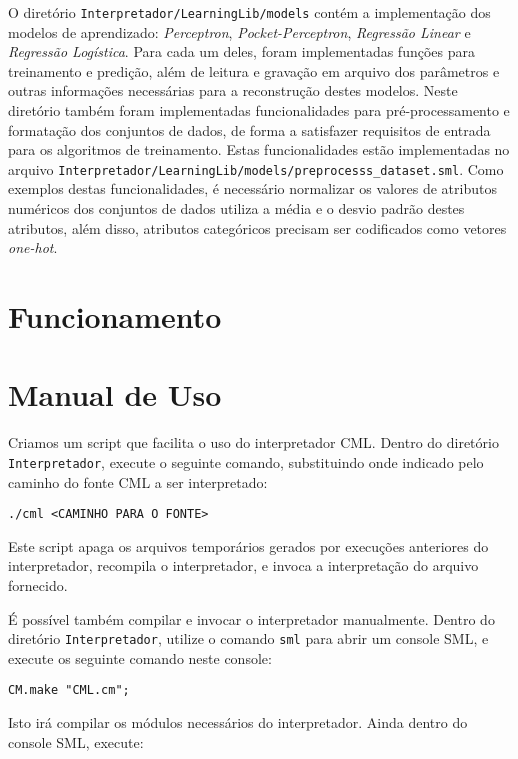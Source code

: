 \documentclass[12pt]{article}
\begin{document}
O diretório \texttt{Interpretador/LearningLib/models} contém a implementação dos modelos de aprendizado: \textit{Perceptron}, \textit{Pocket-Perceptron}, \textit{Regressão Linear} e \textit{Regressão Logística}. Para cada um deles, foram implementadas funções para treinamento e predição, além de leitura e gravação em arquivo dos parâmetros e outras informações necessárias para a reconstrução destes modelos. Neste diretório também foram implementadas funcionalidades para pré-processamento e formatação dos conjuntos de dados, de forma a satisfazer requisitos de entrada para os algoritmos de treinamento. Estas funcionalidades estão implementadas no arquivo \texttt{Interpretador/LearningLib/models/preprocesss\_dataset.sml}. Como exemplos destas funcionalidades, é necessário normalizar os valores de atributos numéricos dos conjuntos de dados utiliza a média e o desvio padrão destes atributos, além disso, atributos categóricos precisam ser codificados como vetores \textit{one-hot}.


\section{Funcionamento}

\section{Manual de Uso}

Criamos um script que facilita o uso do interpretador CML. Dentro do diretório \texttt{Interpretador}, execute o seguinte comando, substituindo onde indicado pelo caminho do fonte CML a ser interpretado:

\begin{verbatim}
./cml <CAMINHO PARA O FONTE>
\end{verbatim}

Este script apaga os arquivos temporários gerados por execuções anteriores do interpretador, recompila o interpretador, e invoca a interpretação do arquivo fornecido.

É possível também compilar e invocar o interpretador manualmente. Dentro do diretório \texttt{Interpretador}, utilize o comando \texttt{sml} para abrir um console SML, e execute os seguinte comando neste console:

\begin{verbatim}
CM.make "CML.cm";
\end{verbatim}

Isto irá compilar os módulos necessários do interpretador. Ainda dentro do console SML, execute:
\end{document}
